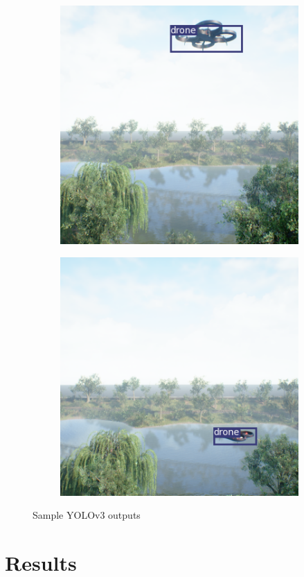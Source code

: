 \documentclass[twoside]{ctuthesis}
\theoremstyle{plain}
\theoremstyle{definition}
\theoremstyle{note}
\begin{document}
\begin{figure}[h]
\begin{subfigure}[b]{0.4\textwidth}
	\end{subfigure}
	\hfill
	\begin{subfigure}[b]{0.4\textwidth}
		\centering
		\includegraphics[width=\textwidth]{02167.png}
	\end{subfigure}
	\hfill
	\begin{subfigure}[b]{0.4\textwidth}
		\centering
		\includegraphics[width=\textwidth]{02665.png}
	\end{subfigure}
	\caption{Sample YOLOv3 outputs}
\end{figure}
\chapter{Results}
\end{document}
